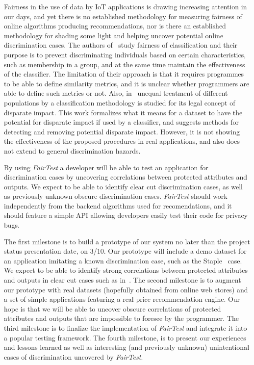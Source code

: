 \documentclass{article}
\newcommand{\thetool}{{\it FairTest}\xspace}
\newcommand{\heading}[1]{\noindent{\bf{#1}}}
\begin{document}
\heading{Related Work.}
Fairness in the use of data by IoT applications is drawing increasing
attention in our days, and yet there is no established methodology for
measuring fairness of online algorithms producing recommendations, nor is
there an established methodology for shading some light and helping
uncover potential online discrimination cases. The authors of~\cite{Fairness}
study fairness of classification and their purpose is to prevent
discriminating individuals based on certain characteristics, such as
membership in a group, and at the same time maintain the effectiveness of
the classifier. The limitation of their approach is that it requires
programmes to be able to define similarity metrics, and it is unclear
whether programmers are able to define such metrics or not. Also,
in~\cite{DisparateImpact} unequal treatment of different populations
by a classification methodology is studied for its legal concept of
disparate impact. This work formalizes what it means for a dataset to
have the potential for disparate impact if used by a classifier, and
suggests methods for detecting and removing potential disparate impact.
However, it is not showing the effectiveness of the proposed procedures
in real applications, and also does not extend to general discrimination
hazards.

\heading{Expected Conclusions.}
By using \thetool a developer will be able to test an application for
discrimination cases by uncovering correlations between protected attributes
and outputs. We expect to be able to identify clear cut discrimination cases,
as well as previously unknown obscure discrimination cases. \thetool should
work independently from the backend algorithms used for recomendations,
and it should feature a
simple API allowing developers easily test their code for privacy bugs.

\heading{Research Plan.}
The first milestone is to build a prototype of our system no later than
the project status presentation date, on 3/10. Our prototype will include a
demo dataset for an application imitating a known discrimination case,
such as the Staple~\cite{Staples} case. We expect to be able to identify
strong correlations between protected attributes and outputs in clear cut
cases such as in~\cite{Staples}. The second milestone is to augment our
prototype with real datasets (hopefully obtained from online web stores)
and a set of simple applications featuring a real price recommendation
engine. Our hope is that we will be able to uncover obscure correlations
of protected attributes and outputs that are impossible to foresee by the
programmer. The third milestone is to finalize the implementation of \thetool
and integrate it into a popular testing framework. The fourth milestone,
is to present our experiences and lessons learned as well as interesting
(and previously unknown) unintentional cases of discrimination
uncovered by \thetool.

{
  \scriptsize
  \setlength\itemsep{0pt}
  \footnotesize
  
  
}
\end{document}
